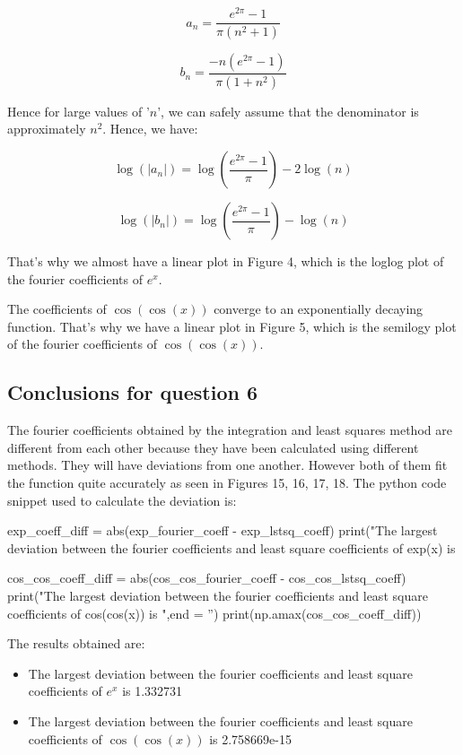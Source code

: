 \documentclass[12pt, a4paper]{article}
\begin{document}
\begin{enumerate}[label=\alph*.]
    \begin{equation*}
        a_{n} = \frac{e^{2\pi}-1}{\pi(n^{2}+1)}
    \end{equation*}

    \begin{equation*}
        b_n = \frac{-n(e^{2\pi}-1)}{\pi(1+n^{2})}
    \end{equation*}

    Hence for large values of '$n$', we can safely assume that the denominator is approximately $n^{2}$. Hence, we have:

    \begin{equation*}
        \log(|a_{n}|) = \log(\frac{e^{2\pi}-1}{\pi}) - 2\log(n)
    \end{equation*}

    \begin{equation*}
        \log(|b_{n}|) = \log(\frac{e^{2\pi}-1}{\pi}) - \log(n)
    \end{equation*}

That's why we almost have a linear plot in Figure 4, which is the loglog plot of the fourier coefficients of $e^{x}$.

The coefficients of $\cos(\cos(x))$ converge to an exponentially decaying function. That's why we have a linear plot in Figure 5, which is the semilogy plot of the fourier coefficients of $\cos(\cos(x))$.

\subsection{Conclusions for question 6}
The fourier coefficients obtained by the integration and least squares method are different from each other because they have
been calculated using different methods. They will have deviations from one another. However both of them fit the function quite
accurately as seen in Figures 15, 16, 17, 18. The python code snippet used to calculate the deviation is:

\begin{py_code}
    exp_coeff_diff = abs(exp_fourier_coeff - exp_lstsq_coeff)
    print("The largest deviation between the fourier coefficients and least square coefficients of exp(x) is %
    
    cos_cos_coeff_diff = abs(cos_cos_fourier_coeff - cos_cos_lstsq_coeff)
    print("The largest deviation between the fourier coefficients and least square coefficients of cos(cos(x)) is ",end = '')
    print(np.amax(cos_cos_coeff_diff))
\end{py_code}
\vspace*{0.4cm}
The results obtained are:
\begin{itemize}
    \item The largest deviation between the fourier coefficients and least square coefficients of $e^{x}$ is 1.332731
    \item The largest deviation between the fourier coefficients and least square coefficients of $\cos(\cos(x))$ is 2.758669e-15
\end{itemize}


\end{enumerate}
\end{document}
